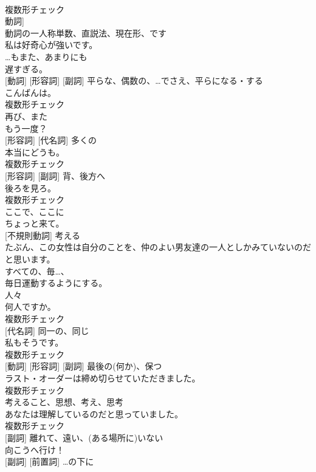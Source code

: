 \documentclass[8pt]{extreport}
\begin{document}
\begin{CJK}{UTF8}{min}
\\	複数形チェック
\\	動詞]	
\\	動詞の一人称単数、直説法、現在形、です	
\\	私は好奇心が強いです。	
\\	[副詞]	…もまた、あまりにも	
\\	遅すぎる。	
\\	[名詞] [動詞] [形容詞] [副詞]	平らな、偶数の、…でさえ、平らになる・する	
\\	こんばんは。	
\\	複数形チェック
\\	[副詞]	再び、また	
\\	もう一度？	
\\	[名詞] [形容詞] [代名詞]	多くの	
\\	本当にどうも。	
\\	複数形チェック
\\	[名詞] [形容詞] [副詞]	背、後方へ	
\\	後ろを見ろ。	
\\	複数形チェック
\\	[副詞]	ここで、ここに	
\\	ちょっと来て。	
\\	[動詞] [不規則動詞]	考える	
\\	たぶん、この女性は自分のことを、仲のよい男友達の一人としかみていないのだと思います。	
\\	[形容詞]	すべての、毎…、	
\\	毎日運動するようにする。	
\\	[名詞]	人々	
\\	何人ですか。	
\\	複数形チェック
\\	[形容詞] [代名詞]	同一の、同じ	
\\	私もそうです。	
\\	複数形チェック
\\	[名詞] [動詞] [形容詞] [副詞]	最後の(何か)、保つ	
\\	ラスト・オーダーは締め切らせていただきました。	
\\	複数形チェック
\\	[名詞]	考えること、思想、考え、思考	
\\	あなたは理解しているのだと思っていました。	
\\	複数形チェック
\\	[形容詞] [副詞]	離れて、遠い、(ある場所に)いない	
\\	向こうへ行け！	
\\	[形容詞] [副詞] [前置詞]	…の下に	

\end{CJK}
\end{document}
